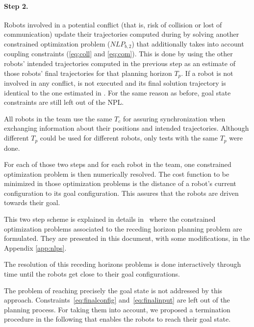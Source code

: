 \paragraph{Step 2.}\label{step2} Robots involved in a potential conflict
(that is, risk of collision or lost of communication) update their trajectories
computed during  by solving another constrained optimization problem ($NLP_{b,2}$) that additionally takes into account
coupling constraints (\ref{eq:coll} and \ref{eq:com}).
This is done by using the other robots' intended
trajectories computed in the previous step as an estimate of those robots'
final trajectories for that planning horizon $T_p$.
If a robot is not involved in any conflict, 
is not executed and its final
solution trajectory is identical to the one estimated in . For the same reason as before, goal state constraints are still left out of the NPL.

\mbox{}

All robots in the team use the same $T_c$ for assuring synchronization when exchanging information about their positions and intended trajectories.
Although different $T_p$ could be used for different robots, only tests with the same $T_p$ were done.

For each of those two steps and for each robot in the team, one constrained optimization problem is then numerically resolved. The cost function to be minimized in those
optimization problems
is the distance of a robot's current configuration to its goal configuration.
This assures that the robots are driven towards their goal.

This two step scheme is explained in details in~\cite{Defoort2007a, Defoort2009} where the 
constrained optimization problems associated to the receding horizon planning problem are formulated. They are presented in this document, with some modifications, in the Appendix \ref{app:nlps}.

The resolution of this receding horizons problems is done interactively through time until the robots get close to their goal configurations.

The problem of reaching precisely the goal state is not addressed by this approach. Constraints~\ref{eq:finalconfig} and~\ref{eq:finalinput} are left out of the planning process.
For taking them into account, we proposed a termination procedure in the following that enables the robots to reach their goal state.


